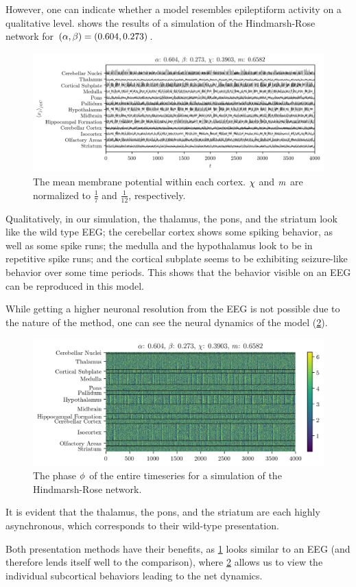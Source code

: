However, one can indicate whether a model resembles epileptiform activity on a qualitative level.
 shows the results of a simulation of the Hindmarsh-Rose network for $\pqty{\hra, \hrb} = \pqty{0.604, 0.273}$.
\begin{figure}[ht]
  \centering
  \includegraphics[width=\textwidth]{figure/means-0_604-0_273}
  \caption[Mean potential by cortex]{The mean membrane potential within each cortex.
    $\chi$ and $m$ are normalized to $\frac{1}{7}$ and $\frac{1}{12}$, respectively.
  }
  \label{fig:mean_604_273}
\end{figure}
Qualitatively, in our simulation,
the thalamus, the pons, and the striatum look like the wild type EEG;
the cerebellar cortex shows some spiking behavior,
as well as some spike runs;
the medulla and the hypothalamus look to be in repetitive spike runs;
and the cortical subplate seems to be exhibiting seizure-like behavior over some time periods.
This shows that the behavior visible on an EEG can be reproduced in this model.

While getting a higher neuronal resolution from the EEG is not possible due to the nature of the method,
one can see the neural dynamics of the model (\cref{fig:overhead_604_273}).
\begin{figure}[ht]
  \centering
  \includegraphics[width=\textwidth]{figure/overhead-0_604-0_273}
  \caption[Hindmarsh-Rose time series]{The phase $\phi$ of the entire timeseries for a simulation of the Hindmarsh-Rose network.}
  \label{fig:overhead_604_273}
\end{figure}
It is evident that the thalamus, the pons, and the striatum are each highly asynchronous, which corresponds to their wild-type presentation.

Both presentation methods have their benefits, as \cref{fig:mean_604_273} looks similar to an EEG (and therefore lends itself well to the comparison), where \cref{fig:overhead_604_273} allows us to view the individual subcortical behaviors leading to the net dynamics.
